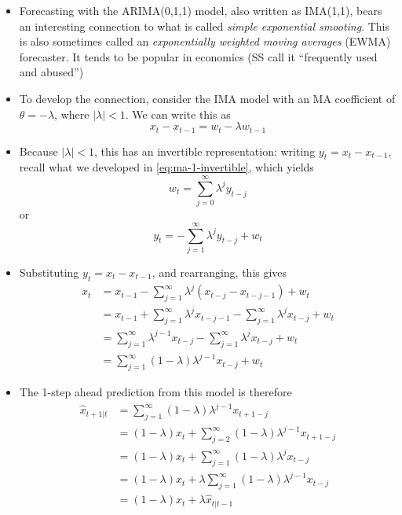 \documentclass{article}
\begin{document}
\begin{itemize}
\item Forecasting with the ARIMA(0,1,1) model, also written as IMA(1,1), bears
  an interesting connection to what is called \emph{simple exponential 
    smooting}. This is also sometimes called an \emph{exponentially weighted
    moving averages} (EWMA) forecaster. It tends to be popular in economics (SS 
  call it ``frequently used and abused'')    

\item To develop the connection, consider the IMA model with an MA coefficient
  of $\theta = -\lambda$, where $|\lambda| < 1$. We can write this as 
  \[
  x_t - x_{t-1} = w_t - \lambda w_{t-1}
  \]

\item Because $|\lambda| < 1$, this has an invertible representation: writing 
  $y_t = x_t - x_{t-1}$, recall what we developed in \eqref{eq:ma-1-invertible},
  which yields
  \[
  w_t = \sum_{j=0}^\infty \lambda^j y_{t-j} 
  \]
  or
  \[
  y_t = -\sum_{j=1}^\infty \lambda^j y_{t-j} + w_t
  \]
  
\item Substituting $y_t = x_t - x_{t-1}$, and rearranging, this gives 
  \begin{align*}
  x_t &= x_{t-1} - \sum_{j=1}^\infty \lambda^j (x_{t-j} - x_{t-j-1}) + w_t \\ 
  &= x_{t-1} + \sum_{j=1}^\infty \lambda^j x_{t-j-1} - \sum_{j=1}^\infty
    \lambda^j x_{t-j} + w_t \\
  &= \sum_{j=1}^\infty \lambda^{j-1} x_{t-j} - \sum_{j=1}^\infty \lambda^j
    x_{t-j} + w_t \\
  &= \sum_{j=1}^\infty (1-\lambda) \lambda^{j-1} x_{t-j} + w_t 
  \end{align*}

\item The 1-step ahead prediction from this model is therefore  
  \begin{align*}
  \hat{x}_{t+1 | t} &= \sum_{j=1}^\infty (1-\lambda) \lambda^{j-1} x_{t+1-j} \\  
  &= (1-\lambda) x_t + \sum_{j=2}^\infty (1-\lambda) \lambda^{j-1} x_{t+1-j} 
    \\
  &= (1-\lambda) x_t + \sum_{j=1}^\infty (1-\lambda) \lambda^j x_{t-j} \\
  &= (1-\lambda) x_t + \lambda \sum_{j=1}^\infty (1-\lambda) \lambda^{j-1}
    x_{t-j} \\
  &= (1-\lambda) x_t + \lambda \hat{x}_{t | t-1}
  \end{align*}


\end{itemize}
\end{document}
